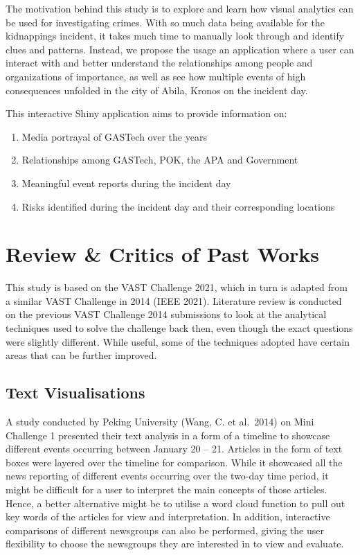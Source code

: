 \documentclass{acm_proc_article-sp}
\providecommand{\tightlist}{%
  \setlength{\itemsep}{0pt}\setlength{\parskip}{0pt}}
\begin{document}
The motivation behind this study is to explore and learn how visual
analytics can be used for investigating crimes. With so much data being
available for the kidnappings incident, it takes much time to manually
look through and identify clues and patterns. Instead, we propose the
usage an application where a user can interact with and better
understand the relationships among people and organizations of
importance, as well as see how multiple events of high consequences
unfolded in the city of Abila, Kronos on the incident day.

This interactive Shiny application aims to provide information on:

\begin{enumerate}
\def\labelenumi{\arabic{enumi}.}
\tightlist
\item
  Media portrayal of GASTech over the years
\item
  Relationships among GASTech, POK, the APA and Government
\item
  Meaningful event reports during the incident day
\item
  Risks identified during the incident day and their corresponding
  locations
\end{enumerate}

\hypertarget{review-critics-of-past-works}{%
\section{Review \& Critics of Past
Works}\label{review-critics-of-past-works}}

This study is based on the VAST Challenge 2021, which in turn is adapted
from a similar VAST Challenge in 2014 (IEEE 2021). Literature review is
conducted on the previous VAST Challenge 2014 submissions to look at the
analytical techniques used to solve the challenge back then, even though
the exact questions were slightly different. While useful, some of the
techniques adopted have certain areas that can be further improved.

\hypertarget{text-visualisations}{%
\subsection{Text Visualisations}\label{text-visualisations}}

A study conducted by Peking University (Wang, C. et al.~2014) on Mini
Challenge 1 presented their text analysis in a form of a timeline to
showcase different events occurring between January 20 -- 21. Articles
in the form of text boxes were layered over the timeline for comparison.
While it showcased all the news reporting of different events occurring
over the two-day time period, it might be difficult for a user to
interpret the main concepts of those articles. Hence, a better
alternative might be to utilise a word cloud function to pull out key
words of the articles for view and interpretation. In addition,
interactive comparisons of different newsgroups can also be performed,
giving the user flexibility to choose the newsgroups they are interested
in to view and evaluate.
\end{document}
